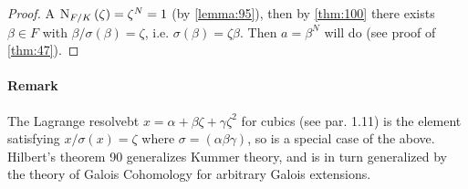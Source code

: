 \begin{proof}
  A $\operatorname{N}_{F/K}\left(\zeta\right) = \zeta^N = 1$ (by \autoref{lemma:95}), then by \autoref{thm:100} there exists $\beta \in F$ with $\beta/\sigma(\beta) = \zeta$, i.e. $\sigma(\beta) = \zeta\beta$. Then $a = \beta^N$ will do (see proof of \autoref{thm:47}).
\end{proof}

\paragraph{Remark}

The Lagrange resolvebt $x = \alpha + \beta\zeta + \gamma\zeta^2$ for cubics (see par. 1.11) is the element satisfying $x/\sigma(x) = \zeta$ where $\sigma = (\alpha \beta \gamma)$, so is a special case of the above. Hilbert's theorem 90 generalizes Kummer theory, and is in turn generalized by the theory of Galois Cohomology for arbitrary Galois extensions.


